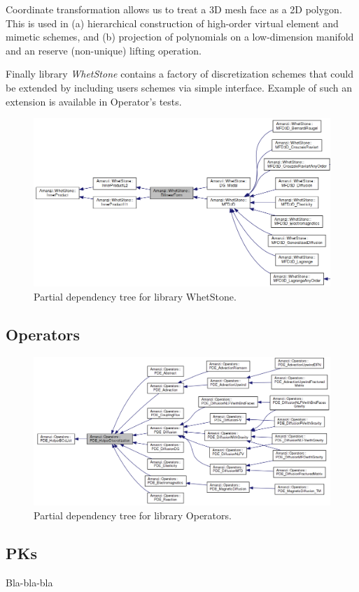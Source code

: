 Coordinate transformation allows us to treat a 3D mesh face as a 2D polygon.
This is used in (a) hierarchical construction of high-order virtual element and mimetic 
schemes, and (b) projection of polynomials on a low-dimension manifold and an reserve (non-unique)
lifting operation.

Finally library {\it WhetStone} contains a factory of discretization schemes that could
be extended by including users schemes via simple interface.
Example of such an extension is available in Operator's tests.


\begin{figure}[h!]
\includegraphics[width=1.0\textwidth]{figs/whetstone.png}
\caption{Partial dependency tree for library WhetStone.\label{fig:whetstone}}
\end{figure}

\clearpage
\subsection{Operators}

\begin{figure}[h!]
\includegraphics[width=1.0\textwidth]{figs/operators.png}
\caption{Partial dependency tree for library Operators.\label{fig:operators}}
\end{figure}


\subsection{PKs}

Bla-bla-bla

